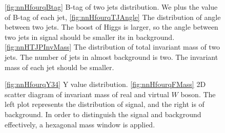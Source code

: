 \documentclass[11pt,a4paper]{cepcnote}
\begin{document}
\begin{figure}[H]
	\centering
	\caption[]{
		\ref{fig:nnHfourqBtag} B-tag of two jets distribution. We plus the value of B-tag of each jet, 
		\ref{fig:nnHfourqTJAngle} The distribution of angle between two jets. The boost of Higgs is larger, so the angle 
		between two jets in signal should be smaller its in background. 
		\ref{fig:nnHTJPInvMass} The distribution of total invariant mass of two jets. The number of jets in almost background is two. 
		The invariant mass of each jet should be smaller.}
	\label{fig:nnHfourqTwoJet}
\end{figure}
\begin{figure}[H]
	\centering
	\caption[]{
		\ref{fig:nnHfourqY34} Y value distribution. 
		\ref{fig:nnHfourqFMass} 2D scatter diagram of invariant mass of real and virtual $W$ boson. The left plot represents the distribution 
		of signal, and the right is of background. In order to distinguish the signal and background effectively, a hexagonal mass window is 
		applied.}
	\label{fig:nnHfourqFourJet}
\end{figure}
\end{document}
